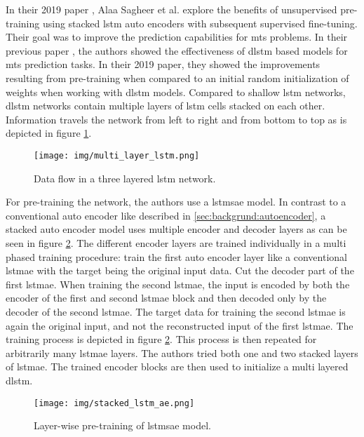 In their 2019 paper \cite{unsupervised_learning_lstms_timeseries}, Alaa Sagheer et al. explore the benefits of unsupervised pre-training using stacked \gls{lstm} auto encoders with subsequent supervised fine-tuning. Their goal was to improve the prediction capabilities for \gls{mts} problems. In their previous paper \cite{dlstm_time_series_forecasting}, the authors showed the effectiveness of \gls{dlstm} based models for \gls{mts} prediction tasks. In their 2019 paper, they showed the improvements resulting from pre-training when compared to an initial random initialization of weights when working with \gls{dlstm} models. Compared to shallow \gls{lstm} networks, \gls{dlstm} networks contain multiple layers of \gls{lstm} cells stacked on each other. Information travels the network from left to right and from bottom to top as is depicted in figure \ref{fig:stateofart:unsupervised_learning_with_lstms_dlstm}. 

\begin{figure}[]
	\centering
	\texttt{[image: img/multi\_layer\_lstm.png]}
	\caption{Data flow in a three layered \gls{lstm} network.}
	\label{fig:stateofart:unsupervised_learning_with_lstms_dlstm}
\end{figure}

For pre-training the network, the authors use a \gls{lstmsae} model. In contrast to a conventional auto encoder like described in \ref{sec:backgrund:autoencoder}, a stacked auto encoder model uses multiple encoder and decoder layers as can be seen in figure \ref{fig:stateofart:unsupervised_learning_dlstm_mts_lstmsae}. The different encoder layers are trained individually in a multi phased training procedure: train the first auto encoder layer like a conventional \gls{lstmae} with the target being the original input data. Cut the decoder part of the first \gls{lstmae}. When training the second \gls{lstmae}, the input is encoded by both the encoder of the first and second \gls{lstmae} block and then decoded only by the decoder of the second \gls{lstmae}. The target data for training the second \gls{lstmae} is again the original input, and not the reconstructed input of the first \gls{lstmae}. The training process is depicted in figure \ref{fig:stateofart:unsupervised_learning_dlstm_mts_lstmsae}. This process is then repeated for arbitrarily many \gls{lstmae} layers. The authors tried both one and two stacked layers of \gls{lstmae}. The trained encoder blocks are then used to initialize a multi layered \gls{dlstm}.

\begin{figure}[]
	\centering
	\texttt{[image: img/stacked\_lstm\_ae.png]}
	\caption{Layer-wise pre-training of \gls{lstmsae} model. \cite{unsupervised_learning_lstms_timeseries}}
	\label{fig:stateofart:unsupervised_learning_dlstm_mts_lstmsae}
\end{figure}

